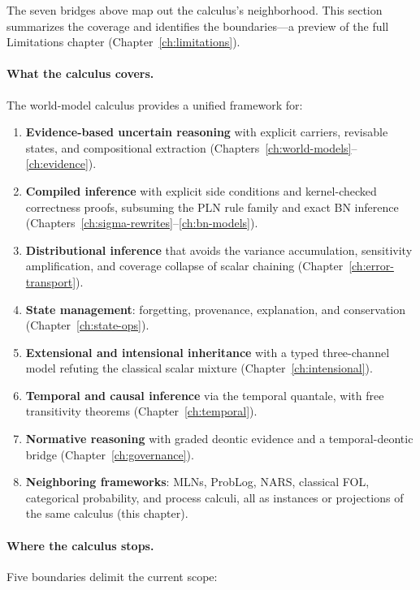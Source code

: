 The seven bridges above map out the calculus's neighborhood.  This
section summarizes the coverage and identifies the boundaries---a
preview of the full Limitations chapter (Chapter~\ref{ch:limitations}).

\paragraph{What the calculus covers.}
The world-model calculus provides a unified framework for:

\begin{enumerate}
\item \textbf{Evidence-based uncertain reasoning} with explicit
  carriers, revisable states, and compositional extraction
  (Chapters~\ref{ch:world-models}--\ref{ch:evidence}).
\item \textbf{Compiled inference} with explicit side conditions and
  kernel-checked correctness proofs, subsuming the PLN rule family
  and exact BN inference (Chapters~\ref{ch:sigma-rewrites}--\ref{ch:bn-models}).
\item \textbf{Distributional inference} that avoids the variance
  accumulation, sensitivity amplification, and coverage collapse of
  scalar chaining (Chapter~\ref{ch:error-transport}).
\item \textbf{State management}: forgetting, provenance,
  explanation, and conservation
  (Chapter~\ref{ch:state-ops}).
\item \textbf{Extensional and intensional inheritance} with a
  typed three-channel model refuting the classical scalar mixture
  (Chapter~\ref{ch:intensional}).
\item \textbf{Temporal and causal inference} via the temporal
  quantale, with free transitivity theorems
  (Chapter~\ref{ch:temporal}).
\item \textbf{Normative reasoning} with graded deontic evidence and
  a temporal-deontic bridge (Chapter~\ref{ch:governance}).
\item \textbf{Neighboring frameworks}: MLNs, ProbLog, NARS,
  classical FOL, categorical probability, and process calculi, all
  as instances or projections of the same calculus (this chapter).
\end{enumerate}

\paragraph{Where the calculus stops.}
Five boundaries delimit the current scope:

